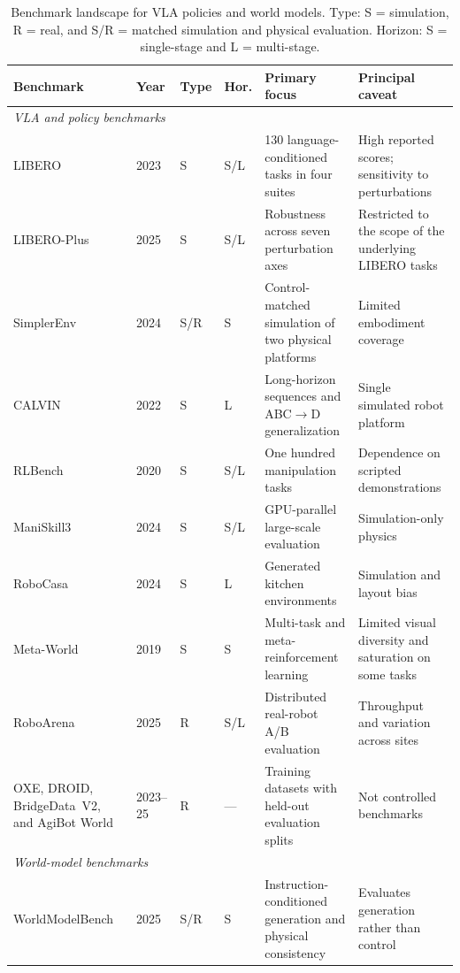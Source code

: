 \documentclass{ieeeaccess}
\begin{document}
\begin{table}[!t]
\caption{Benchmark landscape for VLA policies and world models. Type: S = simulation, R = real, and S/R = matched simulation and physical evaluation. Horizon: S = single-stage and L = multi-stage.}
\label{tab:benchmarks}
\centering
\scriptsize
\setlength{\tabcolsep}{3pt}
\begin{tabular}{p{3.7cm}llp{0.8cm}p{4.4cm}p{4.0cm}}
\toprule
Benchmark & Year & Type & Hor. & Primary focus & Principal caveat \\
\midrule
\multicolumn{6}{l}{\emph{VLA and policy benchmarks}} \\
LIBERO~\cite{liu2023libero} & 2023 & S & S/L &
130 language-conditioned tasks in four suites &
High reported scores; sensitivity to perturbations~\cite{liberoplus} \\

LIBERO-Plus~\cite{liberoplus} & 2025 & S & S/L &
Robustness across seven perturbation axes &
Restricted to the scope of the underlying LIBERO tasks \\

SimplerEnv~\cite{simplerenv} & 2024 & S/R & S &
Control-matched simulation of two physical platforms &
Limited embodiment coverage \\

CALVIN~\cite{calvin} & 2022 & S & L &
Long-horizon sequences and ABC$\to$D generalization &
Single simulated robot platform \\

RLBench~\cite{rlbench} & 2020 & S & S/L &
One hundred manipulation tasks &
Dependence on scripted demonstrations \\

ManiSkill3~\cite{maniskill3} & 2024 & S & S/L &
GPU-parallel large-scale evaluation &
Simulation-only physics \\

RoboCasa~\cite{robocasa} & 2024 & S & L &
Generated kitchen environments &
Simulation and layout bias \\

Meta-World~\cite{metaworld} & 2019 & S & S &
Multi-task and meta-reinforcement learning &
Limited visual diversity and saturation on some tasks \\

RoboArena~\cite{roboarena} & 2025 & R & S/L &
Distributed real-robot A/B evaluation &
Throughput and variation across sites \\

OXE, DROID, BridgeData~V2, and AgiBot World~\cite{oxe,droid,bridgedata,agibotworld} &
2023--25 & R & --- &
Training datasets with held-out evaluation splits &
Not controlled benchmarks \\
\midrule
\multicolumn{6}{l}{\emph{World-model benchmarks}} \\
WorldModelBench~\cite{wmbench} & 2025 & S/R & S &
Instruction-conditioned generation and physical consistency &
Evaluates generation rather than control \\


\end{tabular}
\end{table}
\end{document}
